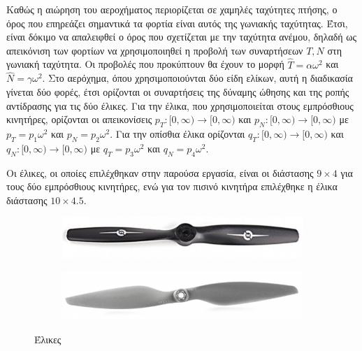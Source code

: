 Καθώς η αιώρηση του αεροχήματος περιορίζεται σε χαμηλές ταχύτητες πτήσης, ο όρος
που επηρεάζει σημαντικά τα φορτία είναι αυτός της γωνιακής ταχύτητας. Έτσι, 
είναι δόκιμο να απαλειφθεί ο όρος που σχετίζεται με την ταχύτητα ανέμου, δηλαδή 
ως απεικόνιση των φορτίων να χρησιμοποιηθεί η προβολή των συναρτήσεων \(T, N\) 
στη γωνιακή ταχύτητα. Οι προβολές που προκύπτουν θα έχουν το μορφή 
\(\widehat{T} = \alpha \omega^2\) και \(\widehat{N} = \gamma \omega^2\).
Στο αερόχημα, όπου χρησιμοποιούνται δύο είδη ελίκων, αυτή η διαδικασία γίνεται 
δύο φορές, έτσι ορίζονται οι συναρτήσεις της δύναμης ώθησης και της ροπής 
αντίδρασης για τις δύο έλικες. Για την έλικα, που χρησιμοποιείται στους 
εμπρόσθιους κινητήρες, ορίζονται οι απεικονίσεις
\(p_T:[0, \infty) \rightarrow [0, \infty) \) και 
\(p_N:[0, \infty) \rightarrow [0, \infty) \) με \(p_T = p_1 \omega ^2\) και
\(p_N = p_2 \omega ^2\).
Για την οπίσθια έλικα ορίζονται
\(q_T:[0, \infty) \rightarrow [0, \infty) \) και 
\(q_N:[0, \infty) \rightarrow [0, \infty) \) με \(q_T = p_3 \omega ^2\) και
\(q_N = p_4 \omega ^2\).   

Οι έλικες, οι οποίες επιλέχθηκαν στην παρούσα εργασία, είναι οι  διάστασης $9\times 4$ για τους δύο εμπρόσθιους κινητήρες, ενώ για τον 
πισινό κινητήρα επιλέχθηκε η έλικα  διάστασης $10 \times 4.5$.

\begin{figure}[hbt!]
    \begin{subfigure}{0.48\textwidth}
        \centering
        \includegraphics[width=\textwidth]{Propeller/Master_Airsrew_9x4.jpg} 
        \caption{}
    \end{subfigure}
    \begin{subfigure}{0.48\textwidth}
        \centering
        \includegraphics[width=\textwidth]{Propeller/APCProp_10x45MR.png}
        \caption{}
    \end{subfigure}
    \caption{Έλικες}
    \label{fig:image2}
\end{figure}

